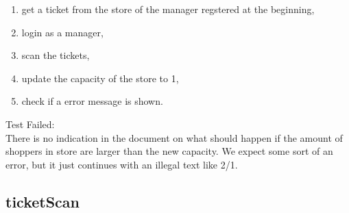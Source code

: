 \begin{itemize}
\begin{enumerate}
        \item get a ticket from the store of the manager regstered at the beginning,

        \item login as a manager,

        \item scan the tickets,

        \item update the capacity of the store to 1,

        \item check if a error message is shown.
    \end{enumerate}
    Test Failed: \\
    There is no indication in the document on what should happen if the amount of shoppers in store are larger than the new capacity.
    We expect some sort of an error, but it just continues with an illegal text like 2/1.
\end{itemize}

\subsection{ticketScan}


